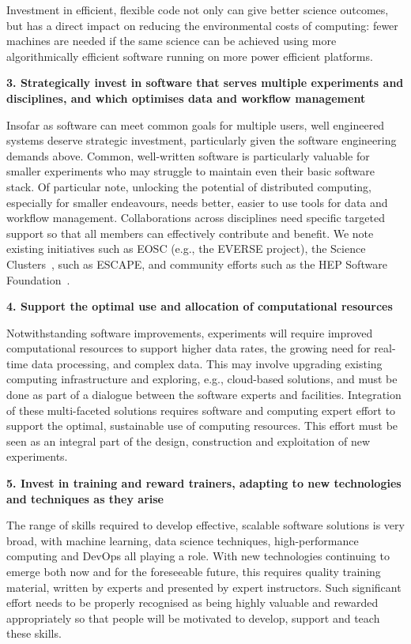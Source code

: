 Investment in efficient, flexible code not only can give better science outcomes, but has a direct impact on reducing the environmental costs of computing: fewer machines are needed if the same science can be achieved using more algorithmically efficient software running on more power efficient platforms.

{\bf 3. Strategically invest in software that serves multiple experiments and disciplines, and which optimises data and workflow management}

Insofar as software can meet common goals for multiple users, well engineered systems deserve strategic investment, particularly given the software engineering demands above. Common, well-written software is particularly valuable for smaller experiments who may struggle to maintain even their basic software stack.
Of particular note, unlocking the potential of distributed computing, especially for smaller endeavours, needs better, easier to use tools for data and workflow management.
Collaborations across disciplines need specific targeted support so that all members can effectively contribute and benefit. We note existing initiatives such as EOSC (e.g., the EVERSE project), the Science Clusters~\cite{ScienceClusters}, such as ESCAPE, and community efforts such as the HEP Software Foundation~\cite{HSF}.

{\bf 4. Support the optimal use and allocation of computational resources}

Notwithstanding software improvements, experiments will require improved computational resources to support higher data rates, the growing need for real-time data processing, and complex data. This may involve upgrading existing computing infrastructure and exploring, e.g., cloud-based solutions, and must be done as part of a dialogue between the software experts and facilities. Integration of these multi-faceted solutions requires software and computing expert effort to support the optimal, sustainable use of computing resources. This effort must be seen as an integral part of the design, construction and exploitation of new experiments.

{\bf 5. Invest in training and reward trainers, adapting to new technologies and techniques as they arise}

The range of skills required to develop effective, scalable software solutions is very broad, with machine learning, data science techniques, high-performance computing and DevOps all playing a role. With new technologies continuing to emerge both now and for the foreseeable future, this requires quality training material, written by experts and presented by expert instructors. Such significant effort needs to be properly recognised as being highly valuable and rewarded appropriately so that people will be motivated to develop, support and teach these skills.

